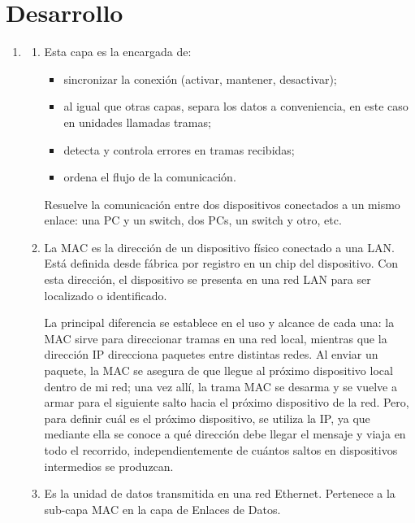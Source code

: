 \documentclass[11pt,a4paper]{article}
\begin{document}
\section{Desarrollo}
\begin{enumerate}
  \item
    \begin{enumerate}
      \item Esta capa es la encargada de:
        \begin{itemize}
          \item sincronizar la conexión (activar, mantener, desactivar);
          \item al igual que otras capas, separa los datos a conveniencia, en este
            caso en unidades llamadas tramas;
          \item detecta y controla errores en tramas recibidas;
          \item ordena el flujo de la comunicación.
        \end{itemize}

        \vspace{\baselineskip}

        Resuelve la comunicación entre dos dispositivos conectados a un mismo
        enlace: una PC y un switch, dos PCs, un switch y otro, etc.
      \item La MAC es la dirección de un dispositivo físico conectado a una LAN.
        Está definida desde fábrica por registro en un chip del dispositivo. Con
        esta dirección, el dispositivo se presenta en una red LAN para ser
        localizado o identificado.

        \vspace{\baselineskip}

        La principal diferencia se establece en el uso y alcance de cada una:
        la MAC sirve para direccionar tramas en una red local, mientras que la
        dirección IP direcciona paquetes entre distintas redes. Al enviar un
        paquete, la MAC se asegura de que llegue al próximo dispositivo local dentro
        de mi red; una vez allí, la trama MAC se desarma y se vuelve a armar para el
        siguiente salto hacia el próximo dispositivo de la red. Pero, para definir
        cuál es el próximo dispositivo, se utiliza la IP, ya que mediante ella se
        conoce a qué dirección debe llegar el mensaje y viaja en todo el recorrido,
        independientemente de cuántos saltos en dispositivos intermedios se
        produzcan.
      \item Es la unidad de datos transmitida en una red Ethernet. Pertenece a la
        sub-capa MAC en la capa de Enlaces de Datos.


\end{enumerate}
\end{enumerate}
\end{document}
